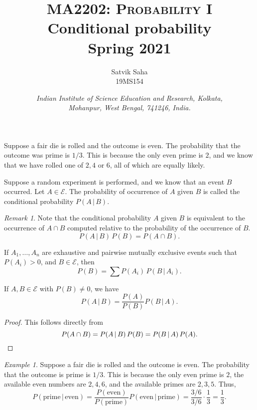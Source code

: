 \documentclass[11pt]{article}
\title{
    \Large\textsc{MA2202: Probability I} \\
    \Huge \textbf{Conditional probability} \\
    \vspace{5pt}
    \Large{Spring 2021}
}
\author{
    \large Satvik Saha%
    \\\textsc{\small 19MS154}
}
\date{\normalsize
    \textit{Indian Institute of Science Education and Research, Kolkata, \\
    Mohanpur, West Bengal, 741246, India.} \\
}
\theoremstyle{definition}
\theoremstyle{remark}
\newtheorem*{remark}{Remark}
\newtheorem*{example}{Example}
\numberwithin{equation}{module}
\begin{document}
    \maketitle

    Suppose a fair die is rolled and the outcome is even. The probability that the
    outcome was prime is $1 /3$. This is because the only even prime is $2$, and we
    know that we have rolled one of $2, 4$ or $6$, all of which are equally likely.
    \begin{definition}
        Suppose a random experiment is performed, and we know that an event $B$
        occurred. Let $A \in \mathcal{E}$. The probability of occurrence of $A$
        given $B$ is called the conditional probability $P(A \,|\, B)$.

        \begin{remark}
            Note that the conditional probability $A$ given $B$ is equivalent to the
            occurrence of $A \cap B$ computed relative to the probability of the
            occurrence of $B$. \[
                P(A\,|\, B) \,P(B) = P(A \cap B).
            \] 
        \end{remark}
    \end{definition}

    \begin{lemma}
        If $A_1, \dots, A_n$ are exhaustive and pairwise mutually exclusive events
        such that $P(A_i) > 0$, and $B \in \mathcal{E}$, then \[
            P(B) = \sum P(A_i) \, P(B \,|\, A_i).
        \] 
    \end{lemma}

    \begin{theorem}
        If $A, B \in \mathcal{E}$ with $P(B) \neq 0$, we have \[
            P(A \,|\, B) = \frac{P(A)}{P(B)}P(B \,|\, A).
        \]
    \end{theorem}
    \begin{proof}
        This follows directly from \[
            P(A \cap B) = P(A \,|\, B) \,P(B) = P(B \,|\, A) \,P(A). \qedhere
        \] 
    \end{proof}
    \begin{example}
        Suppose a fair die is rolled and the outcome is even. The probability that
        the outcome is prime is $1 /3$. This is because the only even prime is $2$,
        the available even numbers are $2, 4, 6$, and the available primes are 
        $2, 3, 5$. Thus, \[
            P(\text{prime} \,|\, \text{even}) =
            \frac{P(\text{even})}{P(\text{prime})} P(\text{even} \,|\, \text{prime})
            = \frac{3 / 6}{3 / 6} \cdot \frac{1}{3} = \frac{1}{3}.
        \] 
    \end{example}
\end{document}
